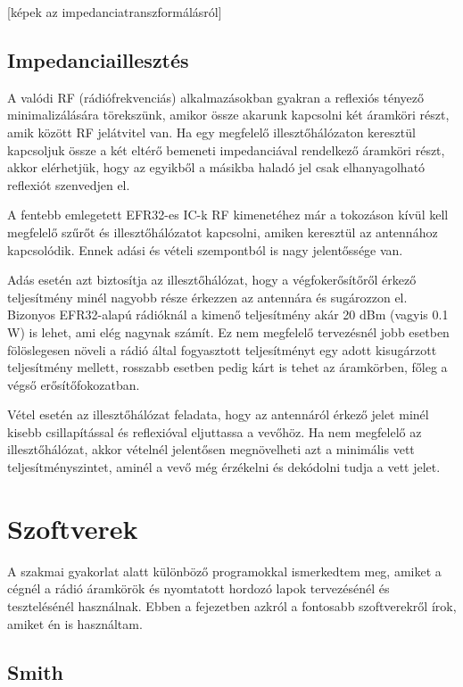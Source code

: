 \documentclass[a4paper,12pt,titlepage]{article}
\begin{document}
[képek az impedanciatranszformálásról]


\subsection{Impedanciaillesztés}

A valódi RF (rádiófrekvenciás) alkalmazásokban gyakran a reflexiós tényező minimalizálására törekszünk, amikor össze akarunk kapcsolni két áramköri részt, amik között RF jelátvitel van. Ha egy megfelelő illesztőhálózaton keresztül kapcsoljuk össze a két eltérő bemeneti impedanciával rendelkező áramköri részt, akkor elérhetjük, hogy az egyikből a másikba haladó jel csak elhanyagolható reflexiót szenvedjen el.

A fentebb emlegetett EFR32-es IC-k RF kimenetéhez már a tokozáson kívül kell megfelelő szűrőt és illesztőhálózatot kapcsolni, amiken keresztül az antennához kapcsolódik. Ennek adási és vételi szempontból is nagy jelentőssége van.

Adás esetén azt biztosítja az illesztőhálózat, hogy a végfokerősítőről érkező teljesítmény minél nagyobb része érkezzen az antennára és sugározzon el. Bizonyos EFR32-alapú rádióknál a kimenő teljesítmény akár 20 dBm (vagyis 0.1 W) is lehet, ami elég nagynak számít. Ez nem megfelelő tervezésnél jobb esetben fölöslegesen növeli a rádió által fogyasztott teljesítményt egy adott kisugárzott teljesítmény mellett, rosszabb esetben pedig kárt is tehet az áramkörben, főleg a végső erősítőfokozatban.

Vétel esetén az illesztőhálózat feladata, hogy az antennáról érkező jelet minél kisebb csillapítással és reflexióval eljuttassa a vevőhöz. Ha nem megfelelő az illesztőhálózat, akkor vételnél jelentősen megnövelheti azt a minimális vett teljesítményszintet, aminél a vevő még érzékelni és dekódolni tudja a vett jelet.

\section{Szoftverek}

A szakmai gyakorlat alatt különböző programokkal ismerkedtem meg, amiket a cégnél a rádió áramkörök és nyomtatott hordozó lapok tervezésénél és tesztelésénél használnak. Ebben a fejezetben azkról a fontosabb szoftverekről írok, amiket én is használtam.

\subsection{Smith}
\end{document}
